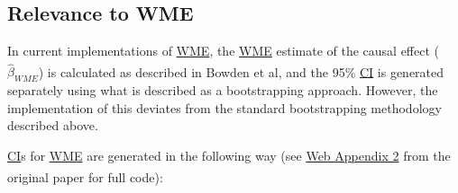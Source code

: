 \documentclass[
]{article}
\begin{document}
\newpage

\subsection{Relevance to WME}\label{relevance-to-wme}

In current implementations of \hyperref[acronyms_WME]{WME}, the \hyperref[acronyms_WME]{WME} estimate of the causal effect (\(\hat{\beta}_{WME}\)) is calculated as described in Bowden et al\textsuperscript{}, and the 95\% \hyperref[acronyms_CI]{CI} is generated separately using what is described as a bootstrapping approach. However, the implementation of this deviates from the standard bootstrapping methodology described above.

\hyperref[acronyms_CI]{CI}s for \hyperref[acronyms_WME]{WME} are generated in the following way (see \href{https://research-information.bris.ac.uk/ws/portalfiles/portal/101612595/Bowden_et_al_2016_Genetic_Epidemiology.sup_1.pdf}{Web Appendix 2} from the original paper\textsuperscript{} for full code):
\end{document}
